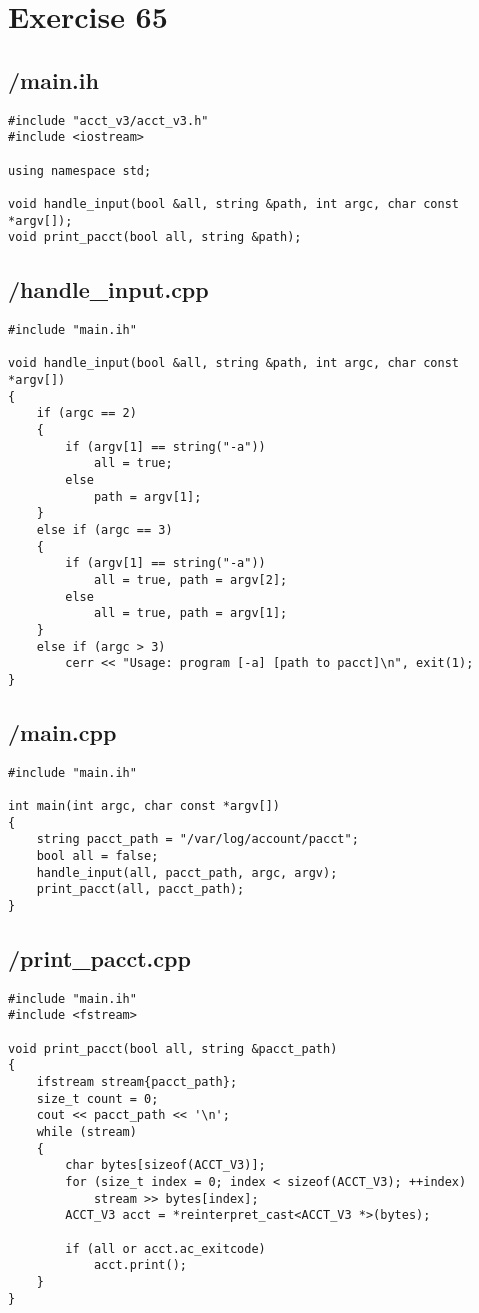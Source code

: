 \documentclass{article}
\begin{document}
\section*{Exercise 65}
\subsection*{/main.ih}
\begin{verbatim}
#include "acct_v3/acct_v3.h"
#include <iostream>

using namespace std;

void handle_input(bool &all, string &path, int argc, char const *argv[]);
void print_pacct(bool all, string &path);

\end{verbatim}
\subsection*{/handle\_input.cpp}
\begin{verbatim}
#include "main.ih"

void handle_input(bool &all, string &path, int argc, char const *argv[])
{
    if (argc == 2)
    {
        if (argv[1] == string("-a"))
            all = true;
        else
            path = argv[1];        
    }
    else if (argc == 3)
    {
        if (argv[1] == string("-a"))
            all = true, path = argv[2];
        else
            all = true, path = argv[1];
    }
    else if (argc > 3) 
        cerr << "Usage: program [-a] [path to pacct]\n", exit(1);
}

\end{verbatim}
\subsection*{/main.cpp}
\begin{verbatim}
#include "main.ih"

int main(int argc, char const *argv[])
{
    string pacct_path = "/var/log/account/pacct";
    bool all = false;
    handle_input(all, pacct_path, argc, argv);
    print_pacct(all, pacct_path);
}
\end{verbatim}
\subsection*{/print\_pacct.cpp}
\begin{verbatim}
#include "main.ih"
#include <fstream>

void print_pacct(bool all, string &pacct_path)
{
    ifstream stream{pacct_path};
    size_t count = 0;
    cout << pacct_path << '\n';
    while (stream)
    {
        char bytes[sizeof(ACCT_V3)];
        for (size_t index = 0; index < sizeof(ACCT_V3); ++index)
            stream >> bytes[index];
        ACCT_V3 acct = *reinterpret_cast<ACCT_V3 *>(bytes);

        if (all or acct.ac_exitcode)
            acct.print();
    }
}

\end{verbatim}
\end{document}
